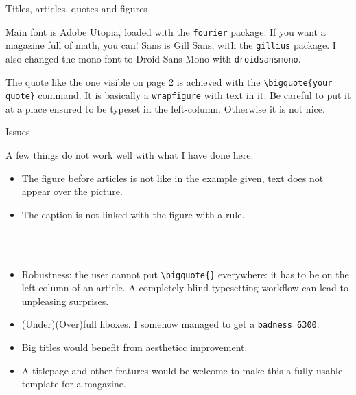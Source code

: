 \documentclass[10pt]{article}
\begin{document}
\begin{article}{Titles, articles, quotes and figures}

Main font is Adobe Utopia, loaded with the \texttt{fourier} package. If you want a magazine full of math, you can! Sans is Gill Sans, with the \texttt{gillius} package. I also changed the mono font to Droid Sans Mono with \texttt{droidsansmono}.



The quote like the one visible on page 2 is achieved with the \texttt{\textbackslash bigquote\{your quote\}} command. It is basically a \texttt{wrapfigure} with text in it. Be careful to put it at a place ensured to be typeset in the left-column. Otherwise it is not nice.


\end{article}


\begin{accented_article}{Issues}

\lettrine[lines=2]{A}{} few things do not work well with what I have done here.

\begin{itemize}\tightlist
\item The figure before articles is not like in the example given, text does not appear over the picture.
\item The caption is not linked with the figure with a rule.
\end{itemize}

~\\
~\\

\begin{itemize}\tightlist
\item Robustness: the user cannot put \texttt{\textbackslash bigquote\{\}} everywhere: it has to be on the left column of an article. A completely blind typesetting workflow can lead to unpleasing surprises.

\item (Under)(Over)full hboxes. I somehow managed to get a \texttt{badness 6300}.

\item Big titles would benefit from aestheticc improvement.

\item A titlepage and other features would be welcome to make this a fully usable template for a magazine.
\end{itemize}

\end{accented_article}
\end{document}
